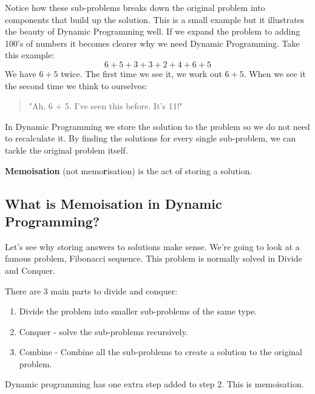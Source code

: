 \documentclass{article}
\begin{document}
Notice how these sub-problems breaks down the original problem into components that build up the solution. This is a small example but it illustrates the beauty of Dynamic Programming well. If we expand the problem to adding 100's of numbers it becomes clearer why we need Dynamic Programming. Take this example:
$$6 + 5 + 3 + 3 + 2 + 4 + 6 + 5$$
We have $6 + 5$ twice. The first time we see it, we work out $6 + 5$. When we see it the second time we think to ourselves:
\begin{quote}
    "Ah, 6 + 5. I've seen this before. It's 11!"
\end{quote}
In Dynamic Programming we store the solution to the problem so we do not need to recalculate it. By finding the solutions for every single sub-problem, we can tackle the original problem itself.

\textbf{Memoisation} (not memo\textbf{r}isation) is the act of storing a solution.
\newpage
\subsection{What is Memoisation in Dynamic Programming?}
Let's see why storing answers to solutions make sense. We're going to look at a famous problem, Fibonacci sequence. This problem is normally solved in Divide and Conquer. 

There are 3 main parts to divide and conquer:
\begin{enumerate}
    \item Divide the problem into smaller sub-problems of the same type.
    \item Conquer - solve the sub-problems recursively.
    \item Combine - Combine all the sub-problems to create a solution to the original problem.
\end{enumerate}
Dynamic programming has one extra step added to step 2. This is memoisation. 
\end{document}
